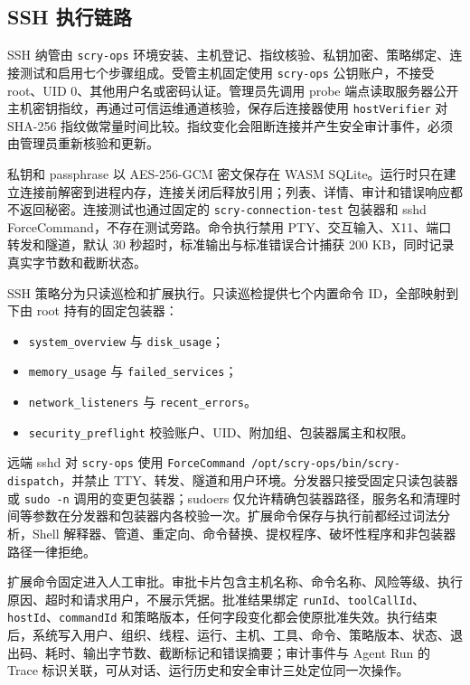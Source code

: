 \documentclass[conference,10pt]{IEEEtran}
\newcommand{\code}[1]{\texttt{#1}}
\newcommand{\filepath}[1]{\path{#1}}
\begin{document}
\subsection{SSH 执行链路}

SSH 纳管由 \code{scry-ops} 环境安装、主机登记、指纹核验、私钥加密、策略绑定、连接测试和启用七个步骤组成。受管主机固定使用 \code{scry-ops} 公钥账户，不接受 root、UID 0、其他用户名或密码认证。管理员先调用 probe 端点读取服务器公开主机密钥指纹，再通过可信运维通道核验，保存后连接器使用 \code{hostVerifier} 对 SHA-256 指纹做常量时间比较。指纹变化会阻断连接并产生安全审计事件，必须由管理员重新核验和更新。

私钥和 passphrase 以 AES-256-GCM 密文保存在 WASM SQLite。运行时只在建立连接前解密到进程内存，连接关闭后释放引用；列表、详情、审计和错误响应都不返回秘密。连接测试也通过固定的 \code{scry-connection-test} 包装器和 sshd ForceCommand，不存在测试旁路。命令执行禁用 PTY、交互输入、X11、端口转发和隧道，默认 30 秒超时，标准输出与标准错误合计捕获 200 KB，同时记录真实字节数和截断状态。

SSH 策略分为只读巡检和扩展执行。只读巡检提供七个内置命令 ID，全部映射到 \filepath{/opt/scry-ops/bin} 下由 root 持有的固定包装器：

\begin{itemize}
  \item \code{system\_overview} 与 \code{disk\_usage}；
  \item \code{memory\_usage} 与 \code{failed\_services}；
  \item \code{network\_listeners} 与 \code{recent\_errors}。
  \item \code{security\_preflight} 校验账户、UID、附加组、包装器属主和权限。
\end{itemize}

远端 sshd 对 \code{scry-ops} 使用 \code{ForceCommand /opt/scry-ops/bin/scry-dispatch}，并禁止 TTY、转发、隧道和用户环境。分发器只接受固定只读包装器或 \code{sudo -n} 调用的变更包装器；sudoers 仅允许精确包装器路径，服务名和清理时间等参数在分发器和包装器内各校验一次。扩展命令保存与执行前都经过词法分析，Shell 解释器、管道、重定向、命令替换、提权程序、破坏性程序和非包装器路径一律拒绝。

扩展命令固定进入人工审批。审批卡片包含主机名称、命令名称、风险等级、执行原因、超时和请求用户，不展示凭据。批准结果绑定 \code{runId}、\code{toolCallId}、\code{hostId}、\code{commandId} 和策略版本，任何字段变化都会使原批准失效。执行结束后，系统写入用户、组织、线程、运行、主机、工具、命令、策略版本、状态、退出码、耗时、输出字节数、截断标记和错误摘要；审计事件与 Agent Run 的 Trace 标识关联，可从对话、运行历史和安全审计三处定位同一次操作。
\end{document}
